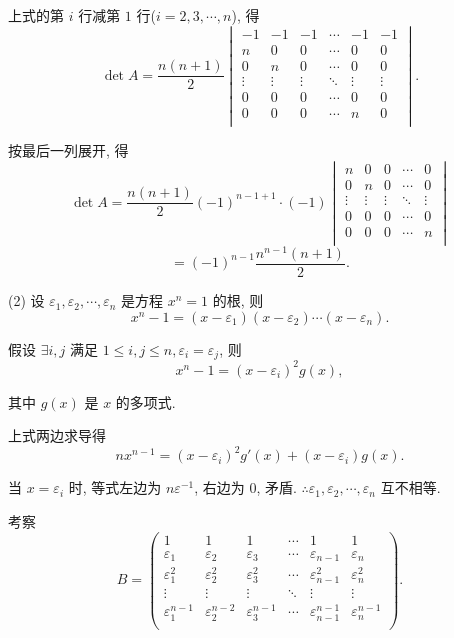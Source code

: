 \documentclass[color=black,device=normal,lang=cn,mode=geye]{elegantnote}
\begin{document}
\begin{solution}
    上式的第 $i$ 行减第 $1$ 行($i=2,3,\cdots,n$), 得
    \[\det A=\dfrac{n(n+1)}{2}\begin{vmatrix}
        -1 & -1 & -1 & \cdots & -1 & -1 \\
        n & 0 & 0 & \cdots & 0 & 0 \\
        0 & n & 0 & \cdots & 0 & 0 \\
        \vdots & \vdots & \vdots & \ddots &\vdots & \vdots \\
        0 & 0 & 0 & \cdots & 0 & 0 \\
        0 & 0 & 0 & \cdots & n & 0 \\
    \end{vmatrix}.\]

    按最后一列展开, 得
    \[\det A=\dfrac{n(n+1)}{2}(-1)^{n-1+1}\cdot(-1)\begin{vmatrix}
        n & 0 & 0 & \cdots & 0 \\
        0 & n & 0 & \cdots & 0 \\
        \vdots & \vdots & \vdots & \ddots & \vdots \\
        0 & 0 & 0 & \cdots & 0 \\
        0 & 0 & 0 & \cdots & n \\
    \end{vmatrix}\]
    \[=(-1)^{n-1}\dfrac{n^{n-1}(n+1)}{2}.\]

    (2) 设 $\varepsilon_1,\varepsilon_2,\cdots,\varepsilon_n$ 是方程 $x^n=1$ 的根, 则
    \[x^n-1=(x-\varepsilon_1)(x-\varepsilon_2)\cdots(x-\varepsilon_n).\]

    假设 $\exists i,j$ 满足 $1\leq i,j\leq n,\varepsilon_i=\varepsilon_j$, 则
    \[x^n-1=(x-\varepsilon_i)^2g(x),\]

    其中 $g(x)$ 是 $x$ 的多项式.

    上式两边求导得
    \[nx^{n-1}=(x-\varepsilon_i)^2g'(x)+(x-\varepsilon_i)g(x).\]

    当 $x=\varepsilon_i$ 时, 等式左边为 $n\varepsilon^{-1}$, 右边为 $0$, 矛盾. $\therefore\varepsilon_1,\varepsilon_2,\cdots,\varepsilon_n$ 互不相等.

    考察
    \[B=\begin{pmatrix}
        1 & 1 & 1 & \cdots & 1 & 1 \\
        \varepsilon_1 & \varepsilon_2 & \varepsilon_3 & \cdots & \varepsilon_{n-1} & \varepsilon_n \\
        \varepsilon_1^2 & \varepsilon_2^2 & \varepsilon_3^2 & \cdots & \varepsilon_{n-1}^2 & \varepsilon_n^2 \\
        \vdots & \vdots & \vdots & \ddots & \vdots & \vdots \\
        \varepsilon_1^{n-1} & \varepsilon_2^{n-2} & \varepsilon_3^{n-1} & \cdots & \varepsilon_{n-1}^{n-1} & \varepsilon_n^{n-1} \\
    \end{pmatrix}.\]


\end{solution}
\end{document}
